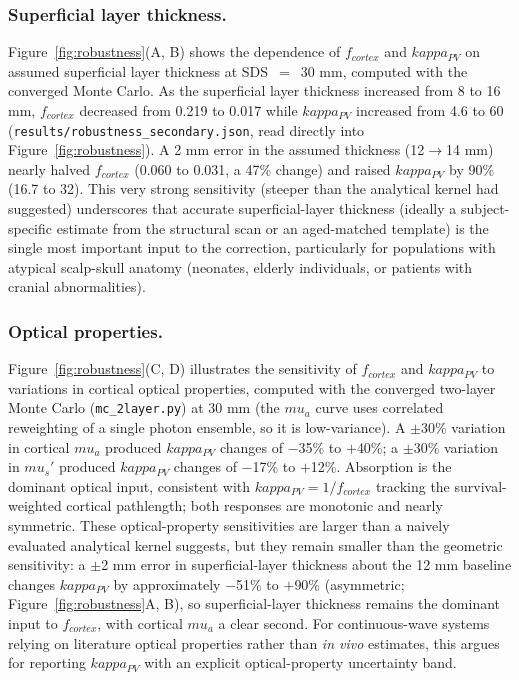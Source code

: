 \documentclass[11pt]{article}
\def\kappa{kappa}%
\def\mu{mu}%
\def\mathrm#1{#1}%
\def\,{ }%
\begin{document}
\subsubsection{Superficial layer thickness.}
Figure~\ref{fig:robustness}(A, B) shows the dependence of $f_{\mathrm{cortex}}$ and $\kappa_{\mathrm{PV}}$ on assumed superficial layer thickness at SDS~$=$~30\,mm, computed with the converged Monte Carlo. As the superficial layer thickness increased from 8 to 16\,mm, $f_{\mathrm{cortex}}$ decreased from 0.219 to 0.017 while $\kappa_{\mathrm{PV}}$ increased from 4.6 to 60 (\texttt{results/robustness\_secondary.json}, read directly into Figure~\ref{fig:robustness}). A 2\,mm error in the assumed thickness (12$\rightarrow$14\,mm) nearly halved $f_{\mathrm{cortex}}$ (0.060 to 0.031, a 47\% change) and raised $\kappa_{\mathrm{PV}}$ by 90\% (16.7 to 32). This very strong sensitivity (steeper than the analytical kernel had suggested) underscores that accurate superficial-layer thickness (ideally a subject-specific estimate from the structural scan or an aged-matched template) is the single most important input to the correction, particularly for populations with atypical scalp-skull anatomy (neonates, elderly individuals, or patients with cranial abnormalities).

\subsubsection{Optical properties.}
Figure~\ref{fig:robustness}(C, D) illustrates the sensitivity of $f_{\mathrm{cortex}}$ and $\kappa_{\mathrm{PV}}$ to variations in cortical optical properties, computed with the converged two-layer Monte Carlo (\texttt{mc\_2layer.py}) at 30\,mm (the $\mu_a$ curve uses correlated reweighting of a single photon ensemble, so it is low-variance). A $\pm$30\% variation in cortical $\mu_a$ produced $\kappa_{\mathrm{PV}}$ changes of $-$35\% to $+$40\%; a $\pm$30\% variation in $\mu_s'$ produced $\kappa_{\mathrm{PV}}$ changes of $-$17\% to $+$12\%. Absorption is the dominant optical input, consistent with $\kappa_{\mathrm{PV}} = 1/f_{\mathrm{cortex}}$ tracking the survival-weighted cortical pathlength; both responses are monotonic and nearly symmetric. These optical-property sensitivities are larger than a naively evaluated analytical kernel suggests, but they remain smaller than the geometric sensitivity: a $\pm$2\,mm error in superficial-layer thickness about the 12\,mm baseline changes $\kappa_{\mathrm{PV}}$ by approximately $-$51\% to $+$90\% (asymmetric; Figure~\ref{fig:robustness}A, B), so superficial-layer thickness remains the dominant input to $f_{\mathrm{cortex}}$, with cortical $\mu_a$ a clear second. For continuous-wave systems relying on literature optical properties rather than \textit{in vivo} estimates, this argues for reporting $\kappa_{\mathrm{PV}}$ with an explicit optical-property uncertainty band.
\end{document}
